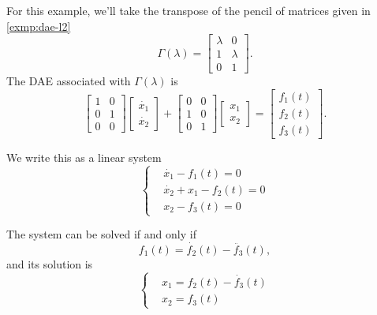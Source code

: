 \pagebreak
\begin{example} \label{exmp:dae-l2T}
    For this example, we'll take the transpose of the pencil of matrices given in \ref{exmp:dae-l2}
    \[
        \Gamma(\lambda) =
        \begin{bmatrix}
            \lambda & 0 \\
            1 & \lambda \\
            0 & 1
        \end{bmatrix}.
    \]
    The DAE associated with \(\Gamma(\lambda)\) is
    \[
        \begin{bmatrix}
            1 & 0 \\
            0 & 1 \\
            0 & 0
        \end{bmatrix}
        \begin{bmatrix}
            \dot{x_{1}} \\
            \dot{x_{2}}
        \end{bmatrix} + 
        \begin{bmatrix}
            0 & 0 \\
            1 & 0 \\
            0 & 1
        \end{bmatrix}
        \begin{bmatrix}
            x_{1} \\
            x_{2}
        \end{bmatrix}=
        \begin{bmatrix}
            f_{1}(t) \\
            f_{2}(t) \\
            f_{3}(t)
        \end{bmatrix}.
    \]

    We write this as a linear system
    \begin{equation*}
        \left\{
            \begin{aligned}
                & \dot{x_{1}} - f_{1}(t) = 0 \\
                & \dot{x_{2}} + x_{1} - f_{2}(t) = 0 \\
                & x_{2} - f_{3}(t) = 0
            \end{aligned}
        \right.
    \end{equation*}

    The system can be solved if and only if
    \[
        f_{1}(t) = \dot{f_{2}}(t) - \ddot{f_{3}}(t),
    \]
    and its solution is
    \begin{equation*}
        \left\{
            \begin{aligned}
                & x_{1} = f_{2}(t) - \dot{f_{3}}(t) \\
                & x_{2} = f_{3}(t)
            \end{aligned}
        \right.
    \end{equation*}
\end{example}
